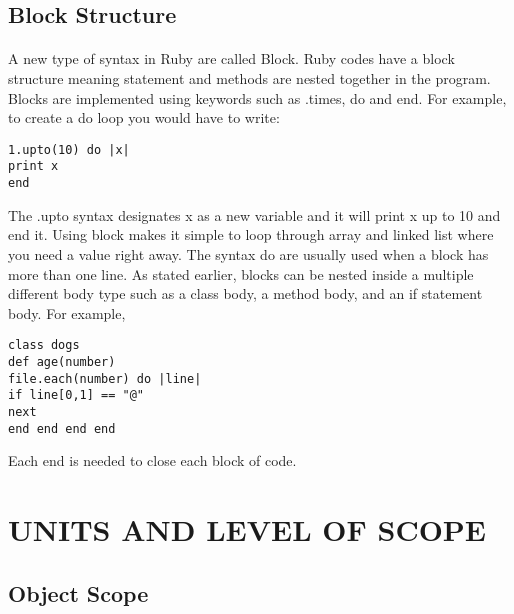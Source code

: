 \documentclass[11pt]{article}
\begin{document}
\subsection{Block Structure}
\paragraph{}
A new type of syntax in Ruby are called Block. Ruby codes have a block structure meaning statement and methods are nested together in the program. Blocks are implemented using keywords such as .times, do and end.\cite{baba} For example, to create a do loop you would have to write: 
\begin{center}
 \texttt{1.upto(10) do |x| \\ print x \\ end }
\end{center}
The .upto syntax designates x as a new variable and it will print x up to 10 and end it. Using block makes it simple to loop through array and linked list where you need a value right away. The syntax do are usually used when a block has more than one line. As stated earlier, blocks can be nested inside a multiple different body type such as a class body, a method body, and an if statement body.\cite{baba} For example, 
\begin{center}
 \texttt{class dogs \\ def age(number) \\  file.each(number) do |line| \\ if line[0,1] == "@" \\ next \\end end end end } 
\end{center}
Each end is needed to close each block of code. 

\section{UNITS AND LEVEL OF SCOPE}
\subsection{Object Scope}
\end{document}
